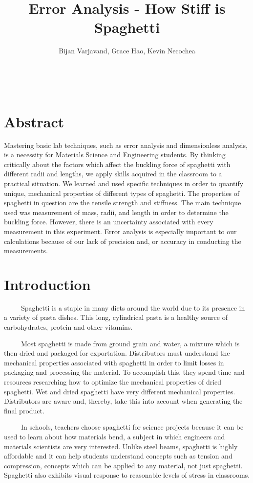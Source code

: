 \documentclass{article}
\author{Bijan Varjavand, Grace Hao, Kevin Necochea}
\title{Error Analysis - How Stiff is Spaghetti}
\begin{document}
\maketitle
\ \\[2in]
\centering
\section{Abstract}
Mastering basic lab techniques, such as error analysis and dimensionless analysis, is a necessity for Materials Science and Engineering students. By thinking critically about the factors which affect the buckling force of spaghetti with different radii and lengths, we apply skills acquired in the classroom to a practical situation. We learned and used specific techniques in order to quantify unique, mechanical properties of different types of spaghetti. The properties of spaghetti in question are the tensile strength and stiffness. The main technique used was measurement of mass, radii, and length in order to determine the buckling force. However, there is an uncertainty associated with every measurement in this experiment. Error analysis is especially important to our calculations because of our lack of precision and, or accuracy in conducting the measurements. 

\clearpage

\raggedright
\linespread{1.5}
\section{Introduction}
\ \ \ \ \ Spaghetti is a staple in many diets around the world due to its presence in a variety of pasta dishes. This long, cylindrical pasta is a healthy source of carbohydrates, protein and other vitamins.

\ \ \ \ \ Most spaghetti is made from ground grain and water, a mixture which is then dried and packaged for exportation. Distributors must understand the mechanical properties associated with spaghetti in order to limit losses in packaging and processing the material. To accomplish this, they spend time and resources researching how to optimize the mechanical properties of dried spaghetti. Wet and dried spaghetti have very different mechanical properties. Distributors are aware and, thereby, take this into account when generating the final product.

\ \ \ \ \ In schools, teachers choose spaghetti for science projects because it can be used to learn about how materials bend, a subject in which engineers and materials scientists are very interested. Unlike steel beams, spaghetti is highly affordable and it can help students understand concepts such as tension and compression, concepts which can be applied to any material, not just spaghetti. Spaghetti also exhibits visual response to reasonable levels of stress in classrooms.
\end{document}
